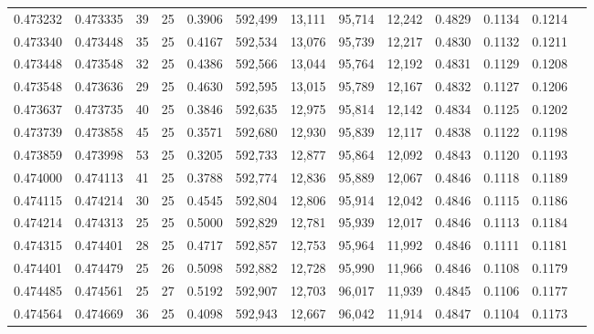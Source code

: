 \begin{tabular}{rrrrrrrrrrrrr}
0.473232 & 0.473335 &    39 &  25 &                                     0.3906 & 592,499 &  13,111 &  95,714 &  12,242 & 0.4829 & 0.1134 & 0.1214 \\
0.473340 & 0.473448 &    35 &  25 &                                     0.4167 & 592,534 &  13,076 &  95,739 &  12,217 & 0.4830 & 0.1132 & 0.1211 \\
0.473448 & 0.473548 &    32 &  25 &                                     0.4386 & 592,566 &  13,044 &  95,764 &  12,192 & 0.4831 & 0.1129 & 0.1208 \\
0.473548 & 0.473636 &    29 &  25 &                                     0.4630 & 592,595 &  13,015 &  95,789 &  12,167 & 0.4832 & 0.1127 & 0.1206 \\
0.473637 & 0.473735 &    40 &  25 &                                     0.3846 & 592,635 &  12,975 &  95,814 &  12,142 & 0.4834 & 0.1125 & 0.1202 \\
0.473739 & 0.473858 &    45 &  25 &                                     0.3571 & 592,680 &  12,930 &  95,839 &  12,117 & 0.4838 & 0.1122 & 0.1198 \\
0.473859 & 0.473998 &    53 &  25 &                                     0.3205 & 592,733 &  12,877 &  95,864 &  12,092 & 0.4843 & 0.1120 & 0.1193 \\
0.474000 & 0.474113 &    41 &  25 &                                     0.3788 & 592,774 &  12,836 &  95,889 &  12,067 & 0.4846 & 0.1118 & 0.1189 \\
0.474115 & 0.474214 &    30 &  25 &                                     0.4545 & 592,804 &  12,806 &  95,914 &  12,042 & 0.4846 & 0.1115 & 0.1186 \\
0.474214 & 0.474313 &    25 &  25 &                                     0.5000 & 592,829 &  12,781 &  95,939 &  12,017 & 0.4846 & 0.1113 & 0.1184 \\
0.474315 & 0.474401 &    28 &  25 &                                     0.4717 & 592,857 &  12,753 &  95,964 &  11,992 & 0.4846 & 0.1111 & 0.1181 \\
0.474401 & 0.474479 &    25 &  26 &                                     0.5098 & 592,882 &  12,728 &  95,990 &  11,966 & 0.4846 & 0.1108 & 0.1179 \\
0.474485 & 0.474561 &    25 &  27 &                                     0.5192 & 592,907 &  12,703 &  96,017 &  11,939 & 0.4845 & 0.1106 & 0.1177 \\
0.474564 & 0.474669 &    36 &  25 &                                     0.4098 & 592,943 &  12,667 &  96,042 &  11,914 & 0.4847 & 0.1104 & 0.1173 \\

\end{tabular}
